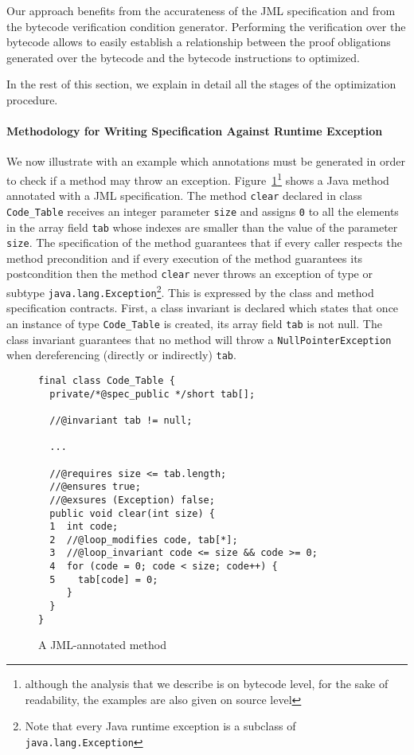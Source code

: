 Our approach benefits from the accurateness of the JML specification and from the bytecode verification condition generator. Performing the verification over the bytecode allows to easily establish a relationship between the proof obligations generated over the bytecode and the bytecode instructions to optimized.

In the rest of this section, we explain in detail all the stages of the optimization procedure.

\paragraph{Methodology for Writing Specification Against Runtime Exception}

We now illustrate with an example which annotations must be generated in order to check if a method may throw an exception. Figure~\ref{fig:jmlexample}\footnote{although the analysis that we describe is on bytecode level, for the sake of readability, the examples are also given on source level} shows a Java method annotated with a JML specification. The method \verb!clear! declared in class \verb!Code_Table! receives an integer parameter \verb!size! and assigns \verb!0! to all the elements in the array field \verb!tab! whose indexes are smaller than the value of the parameter \verb!size!. The specification of the method guarantees that if every caller respects the method precondition and if every execution of the method guarantees its postcondition then the method \verb!clear! never throws an exception of type or subtype \verb!java.lang.Exception!\footnote{Note that every Java runtime exception is a subclass of \texttt{java.lang.Exception}}. This is expressed by the class and method specification contracts.
First, a class invariant is declared which states that once an instance of type \verb!Code_Table! is created, its array field \verb!tab! is not null. The class invariant guarantees that no method will throw a \verb!NullPointerException! when dereferencing (directly or indirectly) \verb!tab!.

\begin{figure}
\begin{verbatim}
final class Code_Table {
  private/*@spec_public */short tab[];

  //@invariant tab != null;

  ...

  //@requires size <= tab.length;
  //@ensures true;
  //@exsures (Exception) false;
  public void clear(int size) {
  1  int code;
  2  //@loop_modifies code, tab[*];
  3  //@loop_invariant code <= size && code >= 0;
  4  for (code = 0; code < size; code++) {
  5    tab[code] = 0;
     }
  }
}
\end{verbatim}

\caption{\sc A JML-annotated method}
\label{fig:jmlexample}
\end{figure}

